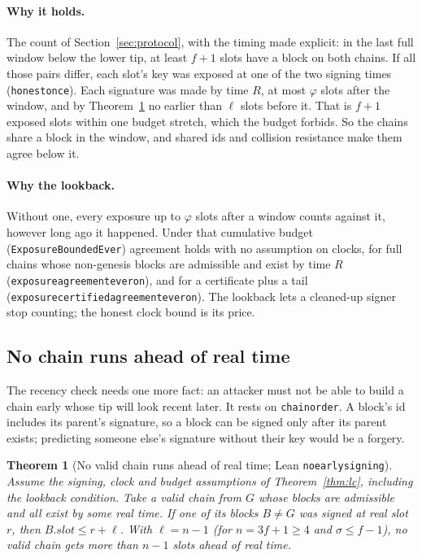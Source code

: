 \documentclass[10pt]{article}
\newtheorem{theorem}{Theorem}
\DeclareRobustCommand{\code}[1]{{\renewcommand{\_}{\textunderscore\allowbreak}\texttt{#1}}}
\newcommand{\fmax}{\ensuremath{f}}
\begin{document}
\paragraph{Why it holds.} The count of Section~\ref{sec:protocol}, with
the timing made explicit: in the last full window below the lower tip,
at least $\fmax + 1$ slots have a block on both chains. If all those
pairs differ, each slot's key was
exposed at one of the two signing times (\code{honest\_once}). Each
signature was made by time $R$, at most $\varphi$ slots after the window,
and by Theorem~\ref{thm:forge} no earlier than $\ell$ slots before it.
That is $\fmax + 1$ exposed slots within one budget stretch, which the
budget forbids. So the chains share a block in the window, and shared ids
and collision resistance make them agree below it.

\paragraph{Why the lookback.} Without one, every exposure up to $\varphi$
slots after a window counts against it, however long ago it happened.
Under that cumulative budget (\code{ExposureBoundedEver}) agreement holds
with no assumption on clocks, for full chains whose non-genesis blocks
are admissible and exist by time $R$
(\code{exposure\_agreement\_ever\_on}), and for a certificate plus a
tail (\code{exposure\_certified\_agreement\_ever\_on}). The lookback lets a
cleaned-up signer stop counting; the honest clock bound is its price.

\subsection{No chain runs ahead of real time}
\label{sec:timed}

The recency check needs one more fact: an attacker must not be able to
build a chain early whose tip will look recent later. It rests on
\code{chain\_order}. A block's id includes its parent's signature, so a
block can be signed only after its parent exists; predicting someone
else's signature without their key would be a forgery.

\begin{theorem}[No valid chain runs ahead of real time; Lean
\code{no\_early\_signing}]\label{thm:forge}
Assume the signing, clock and budget assumptions of
Theorem~\ref{thm:lc}, including the lookback condition. Take a valid
chain from $G$ whose blocks are admissible and all exist by some real
time. If one of its blocks $B \ne G$ was signed at real slot $r$, then
$B.\mathit{slot} \le r + \ell$. With $\ell = n - 1$ (for
$n = 3\fmax + 1 \ge 4$ and $\sigma \le \fmax - 1$), no valid chain gets
more than $n - 1$ slots ahead of real time.
\end{theorem}
\end{document}
